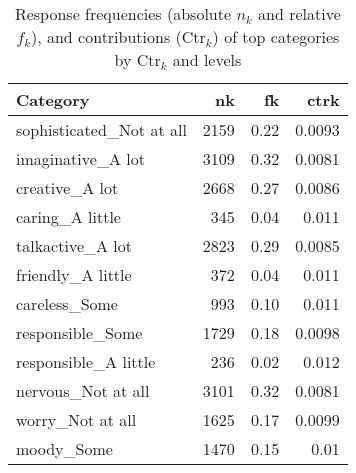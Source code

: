 \begin{table}
\caption{Response frequencies (absolute $n_k$ and relative $f_k$), and contributions ($\text{Ctr}_k$) of  top categories by $\text{Ctr}_k$ and levels}
\centering
\begin{tabular}{lrrr}
  \hline
  Category & nk & fk & ctrk \\ 
  \hline
  sophisticated\_Not at all & 2159 & 0.22 & 0.0093 \\ 
  imaginative\_A lot & 3109 & 0.32 & 0.0081 \\ 
  creative\_A lot & 2668 & 0.27 & 0.0086 \\ 
  caring\_A little & 345 & 0.04 & 0.011 \\ 
  talkactive\_A lot & 2823 & 0.29 & 0.0085 \\ 
  friendly\_A little & 372 & 0.04 & 0.011 \\ 
  careless\_Some & 993 & 0.10 & 0.011 \\ 
  responsible\_Some & 1729 & 0.18 & 0.0098 \\ 
  responsible\_A little & 236 & 0.02 & 0.012 \\ 
  nervous\_Not at all & 3101 & 0.32 & 0.0081 \\ 
  worry\_Not at all & 1625 & 0.17 & 0.0099 \\ 
  moody\_Some & 1470 & 0.15 & 0.01 \\ 
   \hline
\end{tabular}
\label{tab:fknkTop12}
\end{table}